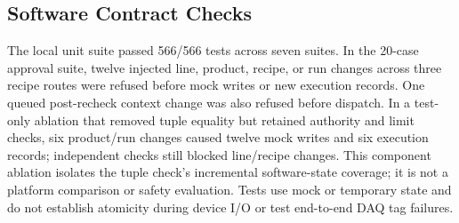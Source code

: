 \subsection{Software Contract Checks}
The local unit suite passed 566/566 tests across seven suites. In the 20-case
approval suite, twelve injected line, product, recipe, or run changes across
three recipe routes were refused before mock writes or new execution records.
One queued post-recheck context change was also refused before dispatch. In a
test-only ablation that removed tuple equality but retained authority and
limit checks, six product/run changes caused twelve mock writes and six
execution records; independent checks still blocked line/recipe changes.
This component ablation isolates the tuple check's incremental software-state
coverage; it is not a platform comparison or safety evaluation. Tests use mock or
temporary state and do not establish atomicity during device I/O or test
end-to-end DAQ tag failures.
